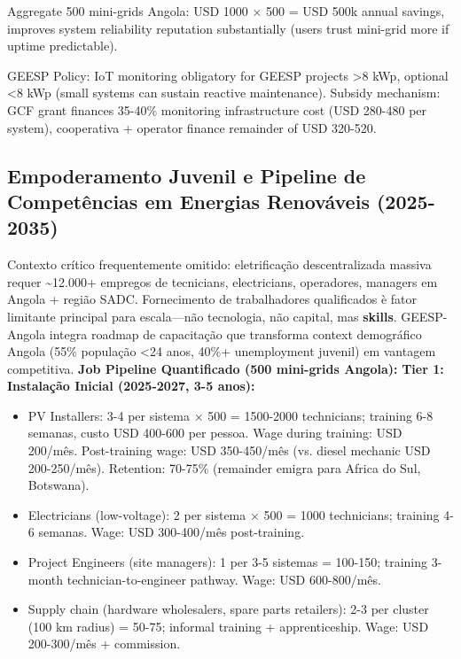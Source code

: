 \documentclass[12pt, a4paper]{article}
\begin{document}
Aggregate 500 mini-grids Angola: USD 1000 × 500 = USD 500k annual savings, improves system reliability reputation substantially (users trust mini-grid more if uptime predictable).

GEESP Policy: IoT monitoring obligatory for GEESP projects >8 kWp, optional <8 kWp (small systems can sustain reactive maintenance). Subsidy mechanism: GCF grant finances 35-40\% monitoring infrastructure cost (USD 280-480 per system), cooperativa + operator finance remainder of USD 320-520.

\subsection{Empoderamento Juvenil e Pipeline de Competências em Energias Renováveis (2025-2035)}

Contexto crítico frequentemente omitido: eletrificação descentralizada massiva requer \textasciitilde{}12.000+ empregos de tecnicians, electricians, operadores, managers em Angola + região SADC. Fornecimento de trabalhadores qualificados è fator limitante principal para escala—não tecnologia, não capital, mas
\textbf{skills}. GEESP-Angola integra roadmap de capacitação que transforma context demográfico Angola (55\% população <24 anos, 40\%+ unemployment juvenil) em vantagem competitiva.
\textbf{Job Pipeline Quantificado (500 mini-grids Angola):}
\textbf{Tier 1: Instalação Inicial (2025-2027, 3-5 anos):}
\begin{itemize}
\item PV Installers: 3-4 per sistema × 500 = 1500-2000 technicians; training 6-8 semanas, custo USD 400-600 per pessoa. Wage during training: USD 200/mês. Post-training wage: USD 350-450/mês (vs. diesel mechanic USD 200-250/mês). Retention: 70-75\% (remainder emigra para Africa do Sul, Botswana).

\item Electricians (low-voltage): 2 per sistema × 500 = 1000 technicians; training 4-6 semanas. Wage: USD 300-400/mês post-training.

\item Project Engineers (site managers): 1 per 3-5 sistemas = 100-150; training 3-month technician-to-engineer pathway. Wage: USD 600-800/mês.

\item Supply chain (hardware wholesalers, spare parts retailers): 2-3 per cluster (100 km radius) = 50-75; informal training + apprenticeship. Wage: USD 200-300/mês + commission.
\end{itemize}
\end{document}
